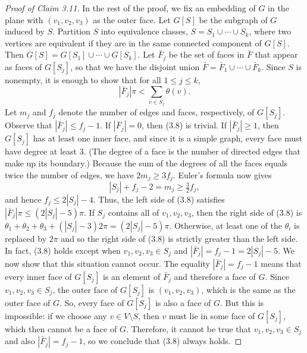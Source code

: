 \begin{proof}[Proof of Claim 3.11]
In the rest of the proof, we fix an embedding of $G$ in the plane with $(v_1,v_2,v_3)$ as the outer face. Let $G[S]$ be the subgraph of $G$ induced by $S$. Partition $S$ into equivalence classes, $S=S_1\cup\cdots\cup S_k$, where two vertices are equivalent if they are in the same connected component of $G[S]$. Then $G[S]=G[S_1]\cup\cdots\cup G[S_k]$. Let $\bar F_j$ be the set of faces in $\bar F$ that appear as faces of $G[S_j]$, so that we have the disjoint union $\bar F=\bar F_1\cup\cdots\cup\bar F_k$. Since $S$ is nonempty, it is enough to show that for all $1\le j\le k$,
\[
|\bar F_j|\pi<\sum_{v\in S_j}\theta(v).\tag{3.8}
\]
Let $m_j$ and $f_j$ denote the number of edges and faces, respectively, of $G[S_j]$. Observe that $|\bar F_j|\le f_j-1$. If $|\bar F_j|=0$, then (3.8) is trivial. If $|\bar F_j|\ge1$, then $G[S_j]$ has at least one inner face, and since it is a simple graph, every face must have degree at least $3$. (The degree of a face is the number of directed edges that make up its boundary.) Because the sum of the degrees of all the faces equals twice the number of edges, we have $2m_j\ge3f_j$. Euler's formula now gives
\[
|S_j|+f_j-2=m_j\ge\tfrac32 f_j,
\]
and hence $f_j\le2|S_j|-4$. Thus, the left side of (3.8) satisfies $|\bar F_j|\pi\le(2|S_j|-5)\pi$.
If $S_j$ contains all of $v_1,v_2,v_3$, then the right side of (3.8) is
$\theta_1+\theta_2+\theta_3+(|S_j|-3)2\pi=(2|S_j|-5)\pi$. Otherwise, at least one of the $\theta_i$ is replaced by $2\pi$ and so the right side of (3.8) is strictly greater than the left side. In fact, (3.8) holds except when $v_1,v_2,v_3\in S_j$ and $|\bar F_j|=f_j-1=2|S_j|-5$. We now show that this situation cannot occur.
The equality $|\bar F_j|=f_j-1$ means that every inner face of $G[S_j]$ is an element of $\bar F_j$ and therefore a face of $G$. Since $v_1,v_2,v_3\in S_j$, the outer face of $G[S_j]$ is $(v_1,v_2,v_3)$, which is the same as the outer face of $G$. So, every face of $G[S_j]$ is also a face of $G$. But this is impossible: if we choose any $v\in V\setminus S$, then $v$ must lie in some face of $G[S_j]$, which then cannot be a face of $G$. Therefore, it cannot be true that $v_1,v_2,v_3\in S_j$ and also $|\bar F_j|=f_j-1$, so we conclude that (3.8) always holds.
\end{proof}

